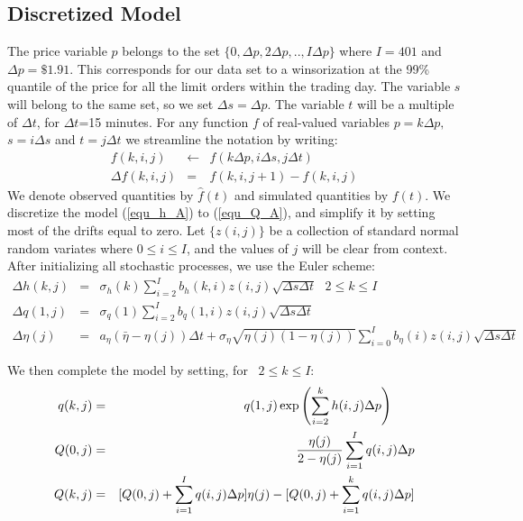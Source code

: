\documentclass{article}
\begin{document}
\subsection{Discretized Model}

The price variable $p$ belongs to the set $\{0,\Delta p,2\Delta p,..,I\Delta
p\}$ where $I=401$ and $\Delta p=\$1.91$. This corresponds for our data set
to a winsorization at the 99\% quantile of the price for all the limit
orders within the trading day. The variable $s$ will belong to the same set,
so we set $\Delta s=\Delta p$. The variable $t$ will be a multiple of $%
\Delta t$, for $\Delta t$=15 minutes. For any function $f$ of real-valued
variables $p=k\Delta p,$ $s=i\Delta s$ and $t=j\Delta t$ we streamline the
notation by writing:
\begin{eqnarray*}
f(k,i,j) &\leftarrow &f(k\Delta p,i\Delta s,j\Delta t) \\
\Delta f(k,i,j) &=&f(k,i,j+1)-f(k,i,j)
\end{eqnarray*}
We denote observed quantities by $\hat{f}(t)$ and simulated quantities by $%
f(t)$. We discretize the model (\ref{equ_h_A}) to (\ref{equ_Q_A}), and
simplify it by setting most of the drifts equal to zero.  Let $\{z(i,j)\}$
be a collection of standard normal random variates where $0\leq i\leq I$,
and the values of $j$ will be clear from context. After initializing all
stochastic processes, we use the Euler scheme:%
\begin{eqnarray}
\Delta h(k,j) &=&\sigma _{h}(k)\sum_{i=2}^{I}b_{h}(k,i)z(i,j)\sqrt{\Delta
s\Delta t}\text{ \ \ \ }2\leq k\leq I  \label{Euler_1} \\
\Delta q(1,j) &=&\sigma _{q}(1)\sum_{i=2}^{I}b_{q}(1,i)z(i,j)\sqrt{\Delta
s\Delta t}  \label{Euler_2} \\
\Delta \eta (j) &=&a_{\eta }(\bar{\eta}-\eta (j))\Delta t+\sigma _{\eta }%
\sqrt{\eta (j)(1-\eta (j))}\sum_{i=0}^{I}b_{\eta }(i)z(i,j)\sqrt{\Delta
s\Delta t}  \label{Euler_3}
\end{eqnarray}

We then complete the model by setting, for \ $2\leq k\leq I$:%
\begin{eqnarray*}
q(k,j) &=&q(1,j)\exp \left( {\sum_{i=2}^{k}h(i,j)\Delta p}\right) \text{ \ \
} \\
Q(0,j) &=&\frac{\eta (j)}{2-\eta (j)}\sum_{i=1}^{I}q(i,j){\Delta p} \\
Q(k,j) &=&[Q(0,j)+\sum_{i=1}^{I}q(i,j)\Delta p]\eta
(j)-[Q(0,j)+\sum_{i=1}^{k}q(i,j)\Delta p]
\end{eqnarray*}
\end{document}
